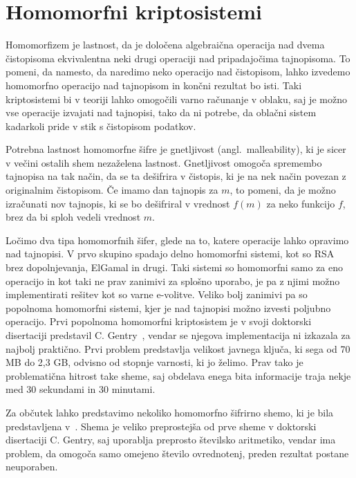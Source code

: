 \documentclass[12pt,a4paper,openany,tikz]{book}
\theoremstyle{plain}
\theoremstyle{definition}
\begin{document}
\section{Homomorfni kriptosistemi}
\label{sec:Homomorfni kriptosistemi}

Homomorfizem je lastnost, da je določena algebraična operacija nad dvema čistopisoma ekvivalentna neki drugi operaciji nad pripadajočima tajnopisoma. To pomeni, da namesto, da naredimo neko operacijo nad čistopisom, lahko izvedemo homomorfno operacijo nad tajnopisom in končni rezultat bo isti. Taki kriptosistemi bi v teoriji lahko omogočili varno računanje v oblaku, saj je možno vse operacije izvajati nad tajnopisi, tako da ni potrebe, da oblačni sistem kadarkoli pride v stik s čistopisom podatkov.

Potrebna lastnost homomorfne šifre je gnetljivost (angl.\ malleability), ki je sicer v večini ostalih shem nezaželena lastnost. Gnetljivost omogoča spremembo tajnopisa na tak način, da se ta dešifrira v čistopis, ki je na nek način povezan z originalnim čistopisom. Če imamo dan tajnopis za $m$, to pomeni, da je možno izračunati nov tajnopis, ki se bo dešifriral v vrednost $f(m)$ za neko funkcijo $f$, brez da bi sploh vedeli vrednost $m$.

Ločimo dva tipa homomorfnih šifer, glede na to, katere operacije lahko opravimo nad tajnopisi. V prvo skupino spadajo delno homomorfni sistemi, kot so RSA brez dopolnjevanja, ElGamal in drugi. Taki sistemi so homomorfni samo za eno operacijo in kot taki ne prav zanimivi za splošno uporabo, je pa z njimi možno implementirati rešitev kot so varne e-volitve. Veliko bolj zanimivi pa so popolnoma homomorfni sistemi, kjer je nad tajnopisi možno izvesti poljubno operacijo. Prvi popolnoma homomorfni kriptosistem je v svoji doktorski disertaciji predstavil C. Gentry~\cite{gentry2009fully}, vendar se njegova implementacija ni izkazala za najbolj praktično. Prvi problem predstavlja velikost javnega ključa, ki sega od 70 MB do 2,3 GB, odvisno od stopnje varnosti, ki jo želimo. Prav tako je problematična hitrost take sheme, saj obdelava enega bita informacije traja nekje med 30 sekundami in 30 minutami.

Za občutek lahko predstavimo nekoliko homomorfno šifrirno shemo, ki je bila predstavljena v~\cite{gentry2010computing}. Shema je veliko preprostejša od prve sheme v doktorski disertaciji C. Gentry, saj uporablja preprosto številsko aritmetiko, vendar ima problem, da omogoča samo omejeno število ovrednotenj, preden rezultat postane neuporaben.
\end{document}
